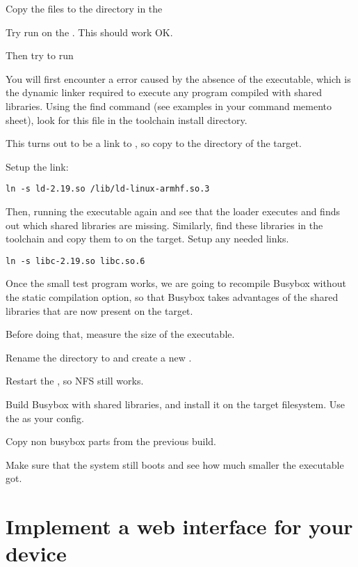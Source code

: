 Copy the files to the  directory in the   

Try run  on the \devboard. This should work OK.

Then try to run 

You will first encounter a  error caused by the absence of
the  executable, which is the dynamic linker
required to execute any program compiled with shared libraries. Using
the find command (see examples in your command memento sheet), look
for this file in the toolchain install directory.

This turns out to be a link to , so copy 
to the  directory of the target.

Setup the link:

\begin{verbatim}
ln -s ld-2.19.so /lib/ld-linux-armhf.so.3
\end{verbatim}

Then, running the executable again and see that the loader executes
and finds out which shared libraries are missing. Similarly, find
these libraries in the toolchain and copy them to  on the
target. Setup any needed links.

\begin{verbatim}
ln -s libc-2.19.so libc.so.6
\end{verbatim}

Once the small test program works, we are going to recompile Busybox
without the static compilation option, so that Busybox takes advantages of the
shared libraries that are now present on the target.

Before doing that, measure the size of the  executable.

Rename the  directory to  
and create a new .

Restart the , so NFS still works.

Build Busybox with shared libraries, and install it on the target filesystem. 
Use the  as your config.

Copy non busybox parts from the previous build.

Make sure that the system still boots and see
how much smaller the  executable got.

\section{Implement a web interface for your device}

